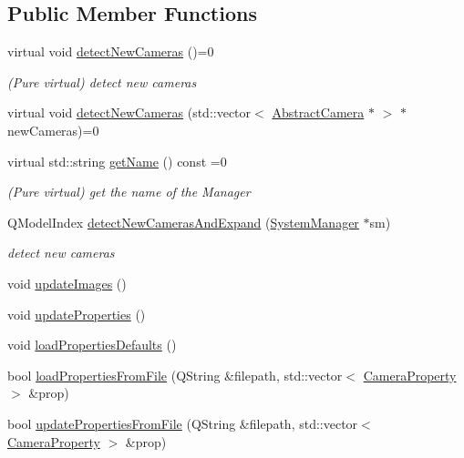 \subsection*{Public Member Functions}
\begin{DoxyCompactItemize}
\item 
virtual void \mbox{\hyperlink{class_abstract_camera_manager_a5285c2cf6e1976d0c22e46f01efdef51}{detect\+New\+Cameras}} ()=0
\begin{DoxyCompactList}\small\item\em (Pure virtual) detect new cameras \end{DoxyCompactList}\item 
virtual void \mbox{\hyperlink{class_abstract_camera_manager_a8e215b2531fd8c18551382dc8f571817}{detect\+New\+Cameras}} (std\+::vector$<$ \mbox{\hyperlink{class_abstract_camera}{Abstract\+Camera}} $\ast$ $>$ $\ast$new\+Cameras)=0
\item 
virtual std\+::string \mbox{\hyperlink{class_abstract_camera_manager_a6e4b041842471b9ed42ddd5c9ab260d1}{get\+Name}} () const =0
\begin{DoxyCompactList}\small\item\em (Pure virtual) get the name of the Manager \end{DoxyCompactList}\item 
Q\+Model\+Index \mbox{\hyperlink{class_abstract_camera_manager_a318bac5016843160762ffe7e271b33b5}{detect\+New\+Cameras\+And\+Expand}} (\mbox{\hyperlink{class_system_manager}{System\+Manager}} $\ast$sm)
\begin{DoxyCompactList}\small\item\em detect new cameras \end{DoxyCompactList}\item 
void \mbox{\hyperlink{class_abstract_camera_manager_a336e5cf760314194c1baf1234b87b247}{update\+Images}} ()
\item 
void \mbox{\hyperlink{class_abstract_camera_manager_a518b8dd27c032030ff23930488da0a52}{update\+Properties}} ()
\item 
void \mbox{\hyperlink{class_abstract_camera_manager_a128aa1d8ba9757ccafd1923a66a3ee9a}{load\+Properties\+Defaults}} ()
\item 
bool \mbox{\hyperlink{class_abstract_camera_manager_ae4c1fb8afd64ed6e843130ac9ccb90ce}{load\+Properties\+From\+File}} (Q\+String \&filepath, std\+::vector$<$ \mbox{\hyperlink{class_camera_manager_1_1_camera_property}{Camera\+Property}} $>$ \&prop)
\item 
bool \mbox{\hyperlink{class_abstract_camera_manager_aeeb2e0003c8aea5e0816277325ff7b61}{update\+Properties\+From\+File}} (Q\+String \&filepath, std\+::vector$<$ \mbox{\hyperlink{class_camera_manager_1_1_camera_property}{Camera\+Property}} $>$ \&prop)

\end{DoxyCompactItemize}
